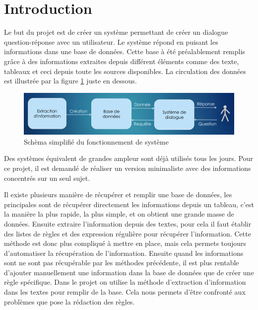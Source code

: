 \documentclass[11pt,a4paper]{article}
\begin{document}



\tableofcontents

\clearpage

\section{Introduction}

Le but du projet est de créer un système permettant de créer un dialogue question-réponse avec un utilisateur. Le système répond en puisant les informations dans une base de données. Cette base à été préalablement remplis grâce à des informations extraites depuis différent éléments comme des texte, tableaux et ceci depuis toute les sources disponibles. 
La circulation des données est illustrée par la figure \ref{fig:schema} juste en dessous.

\begin{figure}[!htb]
	\includegraphics[width=\textwidth]{schemaSysteme.png}
	\caption{Schèma simplifié du fonctionnement de système}
	\label{fig:schema}
\end{figure}

Des systèmes équivalent de grandes ampleur sont déjà utilisés tous les jours. Pour ce projet, il est demandé de réaliser un version minimaliste avec des informations concentrés sur un seul sujet.

Il existe plusieurs manière de récupérer et remplir une base de données, les principales sont de récupérer directement les informations depuis un tableau, c'est la manière la plus rapide, la plus simple, et on obtient une grande masse de données. Ensuite extraire l'information depuis des textes, pour cela il faut établir des listes de règles et des expression régulière pour récupérer l'information. Cette méthode est donc plus compliqué à mettre en place, mais cela permets toujours d'automatiser la récupération de l'information. Ensuite quand les informations sont ne sont pas récupérable par les méthodes précédente, il est plus rentable d'ajouter manuellement une information dans la base de données que de créer une règle spécifique.
Dans le projet on utilise la méthode d'extraction d'information dans les textes pour remplir de la base. Cela nous permets d'être confronté aux problèmes que pose la rédaction des règles.
\end{document}
